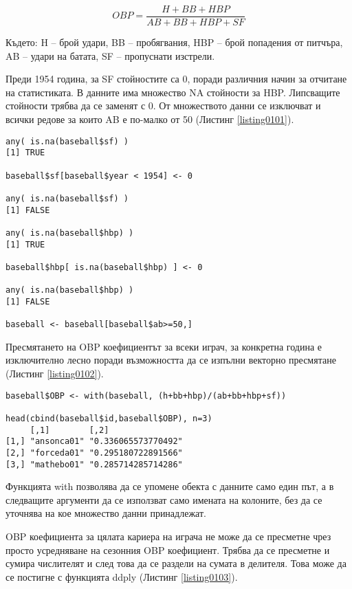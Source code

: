 \begin{equation}
OBP = \frac{H + BB + HBP}{AB + BB + HBP + SF}
\label{equation0001}
\end{equation}

Където:
H – брой удари,
BB – пробягвания,
HBP – брой попадения от питчъра,
AB – удари на батата,
SF – пропуснати изстрели.

Преди 1954 година, за SF стойностите са 0, поради различния начин за отчитане на статистиката. В данните има множество NA стойности за HBP. Липсващите стойности трябва да се заменят с 0. От множеството данни се изключват и всички редове за които AB е по-малко от 50 (Листинг \ref{listing0101}).

\begin{lstlisting}[caption=Корекция на данните, label=listing0101]
any( is.na(baseball$sf) )
[1] TRUE

baseball$sf[baseball$year < 1954] <- 0

any( is.na(baseball$sf) )
[1] FALSE

any( is.na(baseball$hbp) )
[1] TRUE
 
baseball$hbp[ is.na(baseball$hbp) ] <- 0
 
any( is.na(baseball$hbp) )
[1] FALSE

baseball <- baseball[baseball$ab>=50,]
\end{lstlisting}

Пресмятането на OBP коефициентът за всеки играч, за конкретна година е изключително лесно поради възможността да се изпълни векторно пресмятане (Листинг \ref{listing0102}).

\begin{lstlisting}[caption=Пресмятане на OBP, label=listing0102]
baseball$OBP <- with(baseball, (h+bb+hbp)/(ab+bb+hbp+sf))

head(cbind(baseball$id,baseball$OBP), n=3)
     [,1]        [,2]               
[1,] "ansonca01" "0.336065573770492"
[2,] "forceda01" "0.295180722891566"
[3,] "mathebo01" "0.285714285714286"
\end{lstlisting}


Функцията with позволява да се упомене обекта с данните само един път, а в следващите аргументи да се използват само имената на колоните, без да се уточнява на кое множество данни принадлежат. 

OBP коефициента за цялата кариера на играча не може да се пресметне чрез просто усредняване на сезонния OBP коефициент. Трябва да се пресметне и сумира числителят и след това да се раздели на сумата в делителя. Това може да се постигне с функцията ddply (Листинг \ref{listing0103}).

